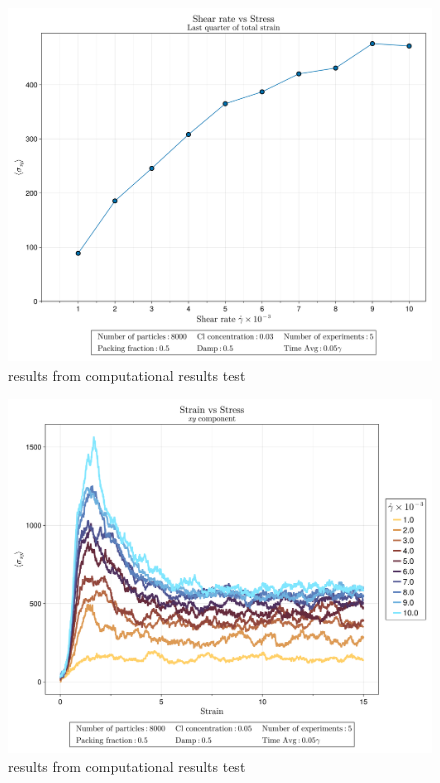 \begin{figure}[ht!]
    \centering
    \includegraphics[width=\textwidth]{figs/ComputaitonalResults/CL3/shearRate.png}
    \caption{results from computational results test}
\end{figure}

\begin{figure}[ht!]
    \centering
    \includegraphics[width=\textwidth]{figs/ComputaitonalResults/CL5/StrainStressXY.png}
    \caption{results from computational results test}
\end{figure}

